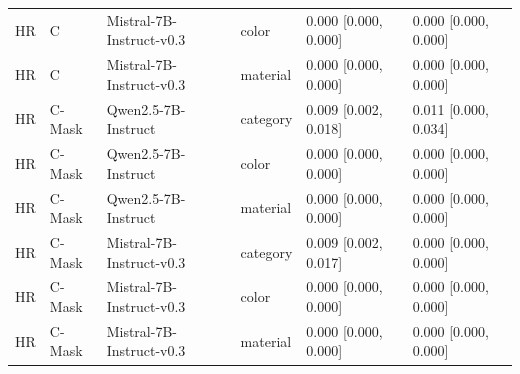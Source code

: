 \begin{tabular}{llllll}
HR & C & Mistral-7B-Instruct-v0.3 & color & 0.000 [0.000, 0.000] & 0.000 [0.000, 0.000] \\
HR & C & Mistral-7B-Instruct-v0.3 & material & 0.000 [0.000, 0.000] & 0.000 [0.000, 0.000] \\
HR & C-Mask & Qwen2.5-7B-Instruct & category & 0.009 [0.002, 0.018] & 0.011 [0.000, 0.034] \\
HR & C-Mask & Qwen2.5-7B-Instruct & color & 0.000 [0.000, 0.000] & 0.000 [0.000, 0.000] \\
HR & C-Mask & Qwen2.5-7B-Instruct & material & 0.000 [0.000, 0.000] & 0.000 [0.000, 0.000] \\
HR & C-Mask & Mistral-7B-Instruct-v0.3 & category & 0.009 [0.002, 0.017] & 0.000 [0.000, 0.000] \\
HR & C-Mask & Mistral-7B-Instruct-v0.3 & color & 0.000 [0.000, 0.000] & 0.000 [0.000, 0.000] \\
HR & C-Mask & Mistral-7B-Instruct-v0.3 & material & 0.000 [0.000, 0.000] & 0.000 [0.000, 0.000] \\
\bottomrule
\end{tabular}
